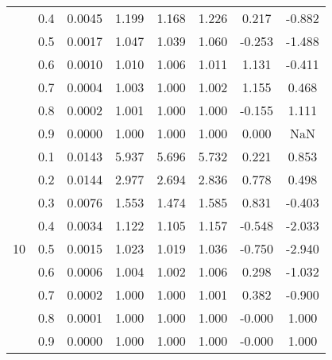 \documentclass[11pt,a4paper]{report}
\begin{document}
\begin{longtable}{ | c | c || c | c | c | c | c | c | }
 & 0.4 & 0.0045 & 1.199 & 1.168 & 1.226 & 0.217 & -0.882 \\
 & 0.5 & 0.0017 & 1.047 & 1.039 & 1.060 & -0.253 & -1.488 \\
 & 0.6 & 0.0010 & 1.010 & 1.006 & 1.011 & 1.131 & -0.411 \\
 & 0.7 & 0.0004 & 1.003 & 1.000 & 1.002 & 1.155 & 0.468 \\
 & 0.8 & 0.0002 & 1.001 & 1.000 & 1.000 & -0.155 & 1.111 \\
 & 0.9 & 0.0000 & 1.000 & 1.000 & 1.000 & 0.000 & NaN \\
 \hline
\multirow{9}{*}{10} & 0.1 & 0.0143 & 5.937 & 5.696 & 5.732 & 0.221 & 0.853 \\
 & 0.2 & 0.0144 & 2.977 & 2.694 & 2.836 & 0.778 & 0.498 \\
 & 0.3 & 0.0076 & 1.553 & 1.474 & 1.585 & 0.831 & -0.403 \\
 & 0.4 & 0.0034 & 1.122 & 1.105 & 1.157 & -0.548 & -2.033 \\
 & 0.5 & 0.0015 & 1.023 & 1.019 & 1.036 & -0.750 & -2.940 \\
 & 0.6 & 0.0006 & 1.004 & 1.002 & 1.006 & 0.298 & -1.032 \\
 & 0.7 & 0.0002 & 1.000 & 1.000 & 1.001 & 0.382 & -0.900 \\
 & 0.8 & 0.0001 & 1.000 & 1.000 & 1.000 & -0.000 & 1.000 \\
 & 0.9 & 0.0000 & 1.000 & 1.000 & 1.000 & -0.000 & 1.000 \\
 \hline
\hline
\end{longtable}
\end{document}

